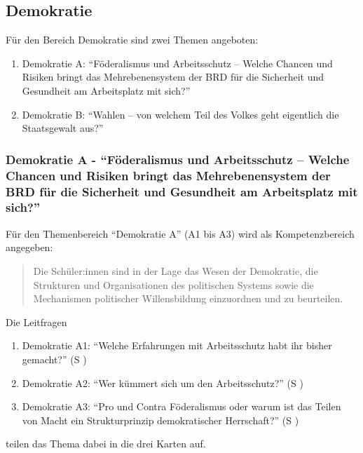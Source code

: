 \subsection{Demokratie}
Für den Bereich Demokratie sind zwei Themen angeboten:
\begin{enumerate}
    \item Demokratie A: \enquote{Föderalismus und Arbeitsschutz – Welche Chancen und Risiken bringt das Mehrebenensystem der BRD für die Sicherheit und Gesundheit am Arbeitsplatz mit sich?}
    \item Demokratie B: \enquote{Wahlen – von welchem Teil des Volkes geht eigentlich die Staatsgewalt aus?}
\end{enumerate}



\subsubsection{Demokratie A - \enquote{Föderalismus und Arbeitsschutz – Welche Chancen und Risiken bringt das Mehrebenensystem der BRD für die Sicherheit und Gesundheit am Arbeitsplatz mit sich?}}

Für den Themenbereich \enquote{Demokratie A} (A1 bis A3) wird als Kompetenzbereich angegeben:
\begin{quote}
    Die Schüler:innen sind in der Lage das Wesen der Demokratie, die Strukturen und Organisationen des politischen Systems sowie die Mechanismen politischer Willensbildung einzuordnen und zu beurteilen.
    
    \autocite[im Bildungsplan:][16]{bplan}
\end{quote}

Die Leitfragen
\begin{enumerate}
    \item Demokratie A1: \enquote{Welche Erfahrungen mit Arbeitsschutz habt ihr bisher gemacht?} (\gls{S} \pageref{DEMOKRATIE-A1})
    \item Demokratie A2: \enquote{Wer kümmert sich um den Arbeitsschutz?} (\gls{S} \pageref{DEMOKRATIE-A2})
    \item Demokratie A3: \enquote{Pro und Contra Föderalismus oder warum ist das Teilen von Macht ein Strukturprinzip demokratischer Herrschaft?} (\gls{S} \pageref{DEMOKRATIE-A3})
\end{enumerate}
teilen das Thema dabei in die drei Karten auf.

